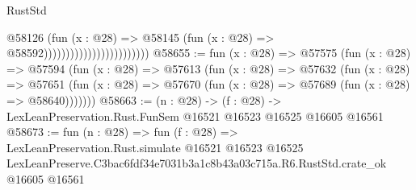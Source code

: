 \begin{lexlean}{RustStd}
\begin{coremodule}
                                              @58126
                                                (fun (x : @28) =>
                                                @58145
                                                  (fun (x : @28) => @58592))))))))))))))))))))))))
@58655 := fun (x : @28) =>
  @57575
    (fun (x : @28) =>
    @57594
      (fun (x : @28) =>
      @57613
        (fun (x : @28) =>
        @57632
          (fun (x : @28) =>
          @57651 (fun (x : @28) => @57670 (fun (x : @28) => @57689 (fun (x : @28) => @58640)))))))
@58663 := (n : @28) ->
  (f : @28) -> LexLeanPreservation.Rust.FunSem @16521 @16523 @16525 @16605 @16561
@58673 := fun (n : @28) =>
  fun (f : @28) =>
  LexLeanPreservation.Rust.simulate
    @16521
    @16523
    @16525
    LexLeanPreserve.C3bac6fdf34e7031b3a1c8b43a03c715a.R6.RustStd.crate_ok
    @16605
    @16561
\end{coremodule}
\end{lexlean}
